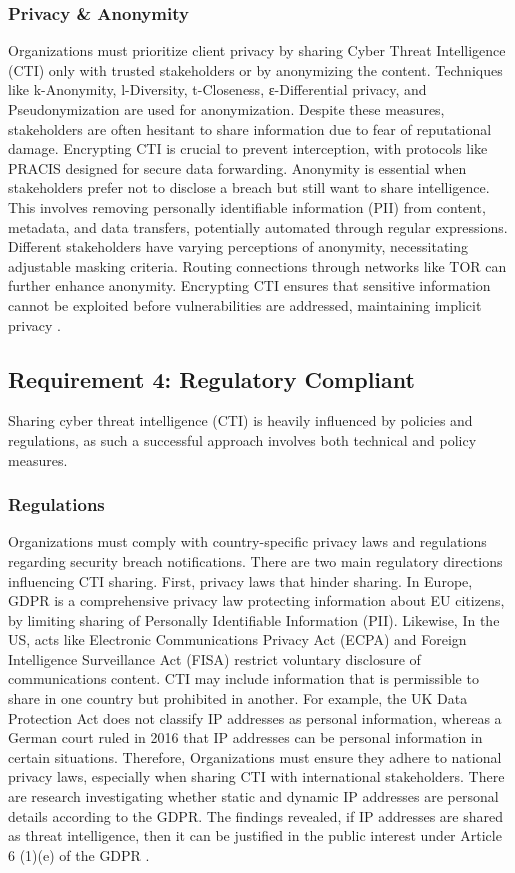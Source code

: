 \subsubsection{Privacy \& Anonymity}
Organizations must prioritize client privacy by sharing Cyber Threat Intelligence (CTI) only with trusted stakeholders or by anonymizing the content. Techniques like k-Anonymity, l-Diversity, t-Closeness, ε-Differential privacy, and Pseudonymization are used for anonymization. Despite these measures, stakeholders are often hesitant to share information due to fear of reputational damage. Encrypting CTI is crucial to prevent interception, with protocols like PRACIS designed for secure data forwarding. Anonymity is essential when stakeholders prefer not to disclose a breach but still want to share intelligence. This involves removing personally identifiable information (PII) from content, metadata, and data transfers, potentially automated through regular expressions. Different stakeholders have varying perceptions of anonymity, necessitating adjustable masking criteria. Routing connections through networks like TOR can further enhance anonymity. Encrypting CTI ensures that sensitive information cannot be exploited before vulnerabilities are addressed, maintaining implicit privacy \cite{wagner_cyber_2019}.

\subsection{Requirement 4: Regulatory Compliant}
Sharing cyber threat intelligence (CTI) is heavily influenced by policies and regulations, as such a successful approach involves both technical and policy measures.

\subsubsection{Regulations}
Organizations must comply with country-specific privacy laws and regulations regarding security breach notifications. There are two main regulatory directions influencing CTI sharing. First, privacy laws that hinder sharing. In Europe, GDPR is a comprehensive privacy law protecting information about EU citizens, by limiting sharing of Personally Identifiable Information (PII). Likewise, In the US, acts like Electronic Communications Privacy Act
(ECPA) and Foreign Intelligence Surveillance Act (FISA) restrict voluntary disclosure of communications content. CTI may include information that is permissible to share in one country but prohibited in another. For example, the UK Data Protection Act does not classify IP addresses as personal information, whereas a German court ruled in 2016 that IP addresses can be personal information in certain situations. Therefore, Organizations must ensure they adhere to national privacy laws, especially when sharing CTI with international stakeholders. There are research investigating whether static and dynamic IP addresses are personal details according to the GDPR. The findings revealed, if IP addresses are shared as threat intelligence, then it can be justified in the public interest under Article 6 (1)(e) of the GDPR \cite{wagner_cyber_2019}.

